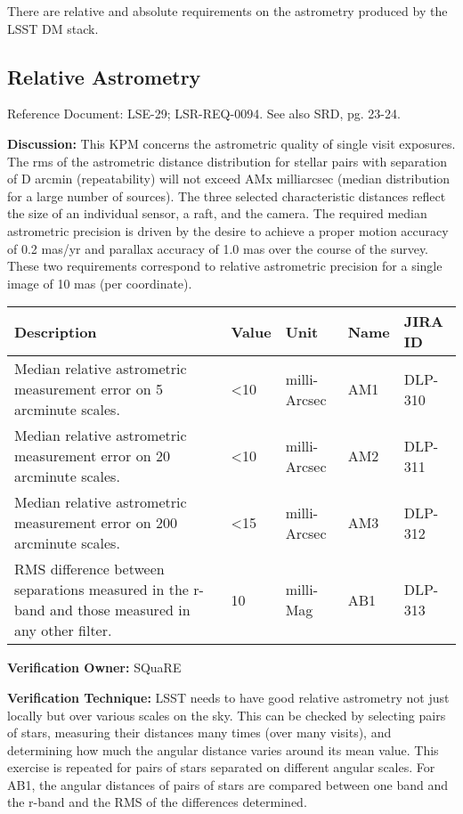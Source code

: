 \documentclass[DM,lsstdraft,toc]{lsstdoc}
\begin{document}
There are relative and absolute requirements on the astrometry produced
by the LSST DM stack.

\subsection{Relative Astrometry}\label{relative-astrometry}

Reference Document: LSE-29; LSR-REQ-0094. See also SRD, pg. 23-24.

\textbf{Discussion:} This KPM concerns the astrometric quality of single
visit exposures. The rms of the astrometric distance distribution for
stellar pairs with separation of D arcmin (repeatability) will not
exceed AMx milliarcsec (median distribution for a large number of
sources). The three selected characteristic distances reflect the size
of an individual sensor, a raft, and the camera. The required median
astrometric precision is driven by the desire to achieve a proper motion
accuracy of 0.2 mas/yr and parallax accuracy of 1.0 mas over the course
of the survey. These two requirements correspond to relative astrometric
precision for a single image of 10 mas (per coordinate).

\begin{longtable}[]{@{}p{}llll@{}}
\toprule
Description & Value & Unit & Name & JIRA ID\tabularnewline
\midrule
\endhead
Median relative astrometric measurement error on 5 arcminute scales. &
\textless{}10 & milli-Arcsec & AM1 & DLP-310\tabularnewline
Median relative astrometric measurement error on 20 arcminute scales. &
\textless{}10 & milli-Arcsec & AM2 & DLP-311\tabularnewline
Median relative astrometric measurement error on 200 arcminute scales. &
\textless{}15 & milli-Arcsec & AM3 & DLP-312\tabularnewline
RMS difference between separations measured in the r-band and those
measured in any other filter. & 10 & milli-Mag & AB1 &
DLP-313\tabularnewline
\bottomrule
\end{longtable}

\textbf{Verification Owner:} SQuaRE

\textbf{Verification Technique:} LSST needs to have good relative
astrometry not just locally but over various scales on the sky. This can
be checked by selecting pairs of stars, measuring their distances many
times (over many visits), and determining how much the angular distance
varies around its mean value. This exercise is repeated for pairs of
stars separated on different angular scales. For AB1, the angular
distances of pairs of stars are compared between one band and the r-band
and the RMS of the differences determined.
\end{document}
